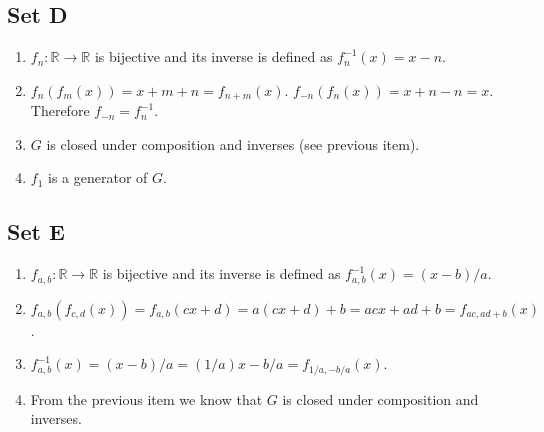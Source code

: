\documentclass{article}
\begin{document}
\subsection{Set D}
\begin{enumerate}
    \item $f_n: \mathbb{R} \to \mathbb{R}$ is bijective and its inverse is defined as $f_n^{-1}(x) = x - n$.

    \item $f_n(f_m(x)) = x + m + n = f_{n + m}(x)$. $f_{-n}(f_n(x)) = x + n - n = x$. Therefore $f_{-n} = f^{-1}_n$.

    \item $G$ is closed under composition and inverses (see previous item).

    \item $f_1$ is a generator of $G$.
\end{enumerate}

\subsection{Set E}
\begin{enumerate}
    \item $f_{a,b}: \mathbb{R} \to \mathbb{R}$ is bijective and its inverse is defined as $f_{a,b}^{-1}(x) = (x - b)/a$.

    \item $f_{a,b}(f_{c,d}(x)) = f_{a,b}(cx + d) = a(cx + d) + b = acx + ad + b = f_{ac, ad + b}(x)$.

    \item $f_{a,b}^{-1}(x) = (x - b)/a = (1/a)x - b/a = f_{1/a, -b/a}(x)$.

    \item From the previous item we know that $G$ is closed under composition and inverses.
\end{enumerate}
\end{document}
